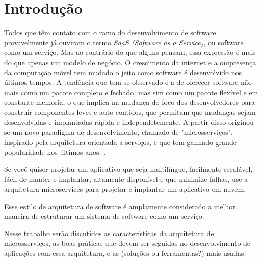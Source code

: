 \chapter{Introdução}\label{chapter-introducao}

Todos que têm contato com o ramo do desenvolvimento de software provavelmente já ouviram o termo \emph{SaaS (Software as a Service)}, ou software como um serviço. Mas ao contrário do que alguns pensam, essa expressão é mais do que apenas um modelo de negócio. O crescimento da internet e a onipresença da computação móvel tem mudado o jeito como software é desenvolvido nos últimos tempos. A tendência que tem-se observado é a de oferecer software não mais como um pacote completo e fechado, mas sim como um pacote flexível e em constante melhoria, o que implica na mudança do foco dos desenvolvedores para construir componentes leves e auto-contidos, que permitam que mudanças sejam desenvolvidas e implantadas rápida e independetemente. A partir disso originou-se um novo paradigma de desenvolvimento, chamado de "microsserviços", inspirado pela arquitetura orientada a serviços, e que tem ganhado grande popularidade nos últimos anos. \cite{middleware-microservices,design-monitoring-testing-waseem}.

\begin{citacao}
    Se você quiser projetar um aplicativo que seja multilíngue, facilmente escalável, fácil de manter e implantar, altamente disponível e que minimize falhas, use a arquitetura microservices para projetar e implantar um aplicativo em nuvem. \cite{oracle_microservices}
\end{citacao}

Esse estilo de arquitetura de software é amplamente considerado a melhor maneira de estruturar um sistema de software como um serviço. \cite{CAOPLE}

Nesse trabalho serão discutidos as características da arquitetura de microsserviços, as boas práticas que devem ser seguidas no desenvolvimento de aplicações com essa arquitetura, e as (soluções ou ferramentas?) mais usadas.


